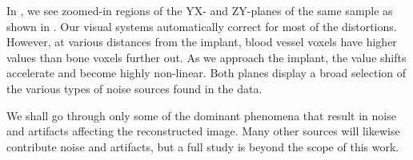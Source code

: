In , we see zoomed-in regions of the YX- and ZY-planes of the
same sample as shown in .  Our visual systems
automatically correct for most of the distortions. However, at various
distances from the implant, blood vessel voxels have higher values than bone
voxels further out. As we approach the implant, the value shifts accelerate and
become highly non-linear.  Both planes display a broad selection of the various
types of noise sources found in the data.

We shall go through only some of the dominant phenomena that result in noise
and artifacts affecting the reconstructed image. Many other sources will
likewise contribute noise and artifacts, but a full study is beyond the scope
of this work.

